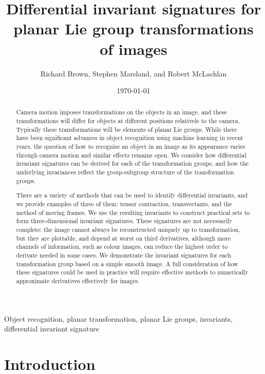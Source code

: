\documentclass[review,onefignum,onetabnum]{siamonline190516}
\date{\today}
\title{Differential invariant signatures for planar Lie group transformations of images}
\author{Richard Brown, Stephen Marsland, and Robert McLachlan}
\begin{document}
\maketitle
\begin{abstract}
Camera motion imposes transformations on the objects in an image, and these transformations will differ for objects at different positions relativele to the camera. Typically these transformations will be elements of planar Lie groups. While there have been significant advances in object recognition using machine learning in recent years, the question of how to recognise an object in an image as its appearance varies through camera motion and similar effects remains open. We consider how differential invariant signatures can be derived for each of the transformation groups, and how the underlying invariances reflect the group-subgroup structure of the transformation groups. 

There are a variety of methods that can be used to identify differential invariants, and we provide examples of three of them: tensor contraction, transvectants, and the method of moving frames. We use the resulting invariants to construct practical sets to form three-dimensional invariant signatures. These signatures are not necessarily complete: the image cannot always be reconstructed uniquely up to transformation, but they are plottable, and depend at worst on third derivatives, although more channels of information, such as colour images, can reduce the highest order to derivate needed in some cases. We demonstrate the invariant signatures for each transformation group based on a simple smooth image. A full consideration of how these signatures could be used in practice will require effective methods to numerically approximate derivatives effectively for images.
\end{abstract}


\begin{keywords}
Object recognition, planar transformation, planar Lie groups, invariants, differential invariant signature
\end{keywords}

\begin{AMS}

\end{AMS}

\section{Introduction}
\end{document}
